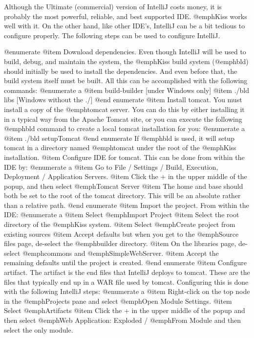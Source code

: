 Although the Ultimate (commercial) version of IntelliJ costs money, it
is probably the most powerful, reliable, and best supported IDE.
@emph{Kiss} works well with it.  On the other hand, like other IDE's,
IntelliJ can be a bit tedious to configure properly.  The following
steps can be used to configure IntelliJ.

@enumerate
@item
Download dependencies.  Even though IntelliJ will be used to build,
debug, and maintain the system, the @emph{Kiss} build system
(@emph{bld}) should initially be used to install the dependencies.
And even before that, the build system itself must be built.  All this
can be accomplished with the following commands:
@enumerate a
@item
build-builder                [under Windows only]
@item
./bld libs                   [Windows without the ./]
@end enumerate
@item
Install tomcat.  You must install a copy of the @emph{tomcat} server.
You can do this by either installing it in a typical way from the
Apache Tomcat site, or you can execute the following @emph{bld}
command to create a local tomcat installation for you:
@enumerate a
@item
./bld setupTomcat
@end enumerate
If @emph{bld} is used, it will setup tomcat in a directory named
@emph{tomcat} under the root of the @emph{Kiss} installation.
@item
Configure IDE for tomcat.  This can be done from within the IDE by:
@enumerate a
@item
Go to File / Settings / Build, Execution, Deployment / Application Servers.
@item
Click the + in the upper middle of the popup, and then select @emph{Tomcat Server}
@item
The home and base should both be set to the root of the tomcat directory.  This
will be an absolute rather than a relative path.
@end enumerate
@item
Import the project.  From within the IDE:
@enumerate a
@item
Select @emph{Import Project}
@item
Select the root directory of the @emph{Kiss} system.
@item
Select @emph{Create project from existing sources}
@item
Accept defaults but when you get to the @emph{Source files} page, de-select the 
@emph{builder} directory.
@item
On the libraries page, de-select @emph{commons} and @emph{SimpleWebServer}.
@item
Accept the remaining defaults until the project is created.
@end enumerate
@item
Configure artifact.  The artifact is the end files that IntelliJ deploys to tomcat.  
These are the files that typically end up in a WAR file used by tomcat.  Configuring
this is done with the following IntelliJ steps:
@enumerate a
@item
Right-click on the top node in the @emph{Projects} pane and select
@emph{Open Module Settings}.
@item
Select @emph{Artifacts}
@item
Click the + in the upper middle of the popup and then select @emph{Web
Application: Exploded} / @emph{From Module} and then select the only module.
